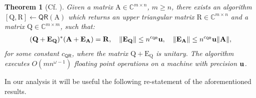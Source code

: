\documentclass{article}
\newtheorem{theorem}{Theorem}[section]
\newcommand\matA{\boldsymbol{\mathrm{A}}}
\newcommand\matE{\boldsymbol{\mathrm{E}}}
\newcommand\matQ{\boldsymbol{\mathrm{Q}}}
\newcommand\matR{\boldsymbol{\mathrm{R}}}
\newcommand{\umach}{\textbf{\textup{u}}}
\newcommand{\QR}{\mathsf{QR}}
\begin{document}
\begin{theorem}[Cf. \cite{demmel2007fastla}]
\label{theorem:alg_qr}
Given a matrix $\matA\in\mathbb{C}^{m\times n}$, $m\geq n$, there exists an algorithm $[\matQ,\matR]\leftarrow\QR(\matA)$ which returns an upper triangular matrix $\matR\in\mathbb{C}^{m\times n}$ and a matrix $\matQ\in\mathbb{C}^{m\times m}$, such that:
\begin{align*}
    (\matQ+\matE_{\matQ})^*(\matA+\matE_{\matA}) = \matR, 
    \quad
    \|\matE_{\matQ}\|\leq n^{c_{\QR}}\umach,
    \quad
    \|\matE_{\matA}\|\leq n^{c_{\QR}}\umach\|\matA\|,
\end{align*}
for some constant $c_{\QR}$, where the matrix $\matQ+\matE_{\matQ}$ is unitary. The algorithm executes $O(mn^{\omega-1})$ floating point operations on a machine with precision $\umach$.
\end{theorem}
In our analysis it will be useful the following re-statement of the aforementioned results.
\end{document}

